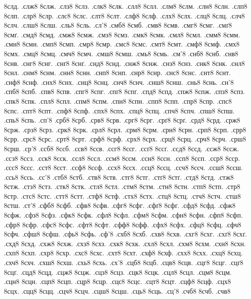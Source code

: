 {8слд.
.слж8
8слж.
.слз8
8слз.
.слк8
8слк.
.слл8
8слл.
.слм8
8слм.
.слн8
8слн.
.слп8
8слп.
.слр8
8слр.
.слс8
8слс.
.слт8
8слт.
.слф8
8слф.
.слх8
8слх.
.слц8
8слц.
.слч8
8слч.
.слш8
8слш.
.сль8
8сль.
.сл'8
.смб8
8смб.
.смв8
8смв.
.смг8
8смг.
.смґ8
8смґ.
.смд8
8смд.
.смж8
8смж.
.смз8
8смз.
.смк8
8смк.
.смл8
8смл.
.смм8
8смм.
.смн8
8смн.
.смп8
8смп.
.смр8
8смр.
.смс8
8смс.
.смт8
8смт.
.смф8
8смф.
.смх8
8смх.
.смц8
8смц.
.смч8
8смч.
.смш8
8смш.
.смь8
8смь.
.см'8
.снб8
8снб.
.снв8
8снв.
.снг8
8снг.
.снґ8
8снґ.
.снд8
8снд.
.снж8
8снж.
.снз8
8снз.
.снк8
8снк.
.снл8
8снл.
.снм8
8снм.
.снн8
8снн.
.снп8
8снп.
.снр8
8снр.
.снс8
8снс.
.снт8
8снт.
.снф8
8снф.
.снх8
8снх.
.снц8
8снц.
.снч8
8снч.
.снш8
8снш.
.снь8
8снь.
.сн'8
.спб8
8спб.
.спв8
8спв.
.спг8
8спг.
.спґ8
8спґ.
.спд8
8спд.
.спж8
8спж.
.спз8
8спз.
.спк8
8спк.
.спл8
8спл.
.спм8
8спм.
.спн8
8спн.
.спп8
8спп.
.спр8
8спр.
.спс8
8спс.
.спт8
8спт.
.спф8
8спф.
.спх8
8спх.
.спц8
8спц.
.спч8
8спч.
.спш8
8спш.
.спь8
8спь.
.сп'8
.срб8
8срб.
.срв8
8срв.
.срг8
8срг.
.срґ8
8срґ.
.срд8
8срд.
.срж8
8срж.
.срз8
8срз.
.срк8
8срк.
.срл8
8срл.
.срм8
8срм.
.срн8
8срн.
.срп8
8срп.
.срр8
8срр.
.срс8
8срс.
.срт8
8срт.
.срф8
8срф.
.срх8
8срх.
.срц8
8срц.
.срч8
8срч.
.срш8
8срш.
.ср'8
.ссб8
8ссб.
.ссв8
8ссв.
.ссг8
8ссг.
.ссґ8
8ссґ.
.ссд8
8ссд.
.ссж8
8ссж.
.ссз8
8ссз.
.сск8
8сск.
.ссл8
8ссл.
.ссм8
8ссм.
.ссн8
8ссн.
.ссп8
8ссп.
.сср8
8сср.
.ссс8
8ссс.
.сст8
8сст.
.ссф8
8ссф.
.ссх8
8ссх.
.ссц8
8ссц.
.ссч8
8ссч.
.ссш8
8ссш.
.ссь8
8ссь.
.сс'8
.стб8
8стб.
.ств8
8ств.
.стг8
8стг.
.стґ8
8стґ.
.стд8
8стд.
.стж8
8стж.
.стз8
8стз.
.стк8
8стк.
.стл8
8стл.
.стм8
8стм.
.стн8
8стн.
.стп8
8стп.
.стр8
8стр.
.стс8
8стс.
.стт8
8стт.
.стф8
8стф.
.стх8
8стх.
.стц8
8стц.
.стч8
8стч.
.стш8
8стш.
.ст'8
.сфб8
8сфб.
.сфв8
8сфв.
.сфг8
8сфг.
.сфґ8
8сфґ.
.сфд8
8сфд.
.сфж8
8сфж.
.сфз8
8сфз.
.сфк8
8сфк.
.сфл8
8сфл.
.сфм8
8сфм.
.сфн8
8сфн.
.сфп8
8сфп.
.сфр8
8сфр.
.сфс8
8сфс.
.сфт8
8сфт.
.сфф8
8сфф.
.сфх8
8сфх.
.сфц8
8сфц.
.сфч8
8сфч.
.сфш8
8сфш.
.сфь8
8сфь.
.сф'8
.схб8
8схб.
.схв8
8схв.
.схг8
8схг.
.схґ8
8схґ.
.схд8
8схд.
.схж8
8схж.
.схз8
8схз.
.схк8
8схк.
.схл8
8схл.
.схм8
8схм.
.схн8
8схн.
.схп8
8схп.
.схр8
8схр.
.схс8
8схс.
.схт8
8схт.
.схф8
8схф.
.схх8
8схх.
.схц8
8схц.
.схч8
8схч.
.схш8
8схш.
.схь8
8схь.
.сх'8
.сцб8
8сцб.
.сцв8
8сцв.
.сцг8
8сцг.
.сцґ8
8сцґ.
.сцд8
8сцд.
.сцж8
8сцж.
.сцз8
8сцз.
.сцк8
8сцк.
.сцл8
8сцл.
.сцм8
8сцм.
.сцн8
8сцн.
.сцп8
8сцп.
.сцр8
8сцр.
.сцс8
8сцс.
.сцт8
8сцт.
.сцф8
8сцф.
.сцх8
8сцх.
.сцц8
8сцц.
.сцч8
8сцч.
.сцш8
8сцш.
.сць8
8сць.
.сц'8
.счб8
8счб.
.счв8
}
